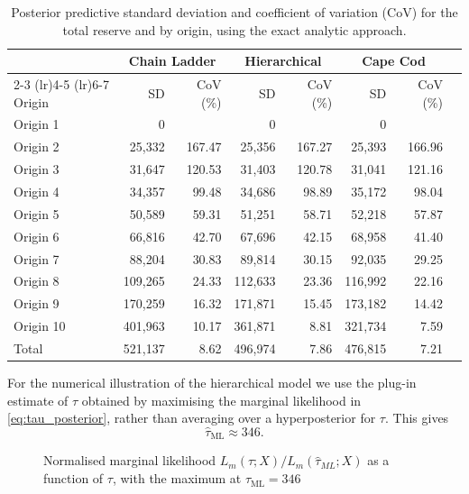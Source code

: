 \documentclass[11pt]{article}
\newcommand{\1}{\mathbf{1}}
\begin{document}
\begin{table}[htbp]
\centering
\begin{tabular}{lrrrrrrr}
\toprule
 & \multicolumn{2}{c}{Chain Ladder} & \multicolumn{2}{c}{Hierarchical} & \multicolumn{2}{c}{Cape Cod} \\
\cmidrule(lr){2-3} \cmidrule(lr){4-5} \cmidrule(lr){6-7}
Origin & SD & CoV (\%) & SD & CoV (\%) & SD & CoV (\%) \\
\midrule
Origin 1 & 0 &  & 0 &  & 0 &  \\
Origin 2 & 25,332 & 167.47 & 25,356 & 167.27 & 25,393 & 166.96 \\
Origin 3 & 31,647 & 120.53 & 31,403 & 120.78 & 31,041 & 121.16 \\
Origin 4 & 34,357 & 99.48 & 34,686 & 98.89 & 35,172 & 98.04 \\
Origin 5 & 50,589 & 59.31 & 51,251 & 58.71 & 52,218 & 57.87 \\
Origin 6 & 66,816 & 42.70 & 67,696 & 42.15 & 68,958 & 41.40 \\
Origin 7 & 88,204 & 30.83 & 89,814 & 30.15 & 92,035 & 29.25 \\
Origin 8 & 109,265 & 24.33 & 112,633 & 23.36 & 116,992 & 22.16 \\
Origin 9 & 170,259 & 16.32 & 171,871 & 15.45 & 173,182 & 14.42 \\
Origin 10 & 401,963 & 10.17 & 361,871 & 8.81 & 321,734 & 7.59 \\
Total & 521,137 & 8.62 & 496,974 & 7.86 & 476,815 & 7.21 \\
\bottomrule
\end{tabular}
\caption{Posterior predictive standard deviation and coefficient of variation (CoV) for the total reserve and by origin, using the exact analytic approach.}
\label{tab:saluz_reserve_sd_analytic}
\end{table}


For the numerical illustration of the hierarchical model  we use the plug-in estimate of $\tau$ obtained by maximising the marginal likelihood in \eqref{eq:tau_posterior}, rather than averaging over a hyperposterior for $\tau$. This gives
\begin{equation}
\widehat{\tau}_{\mathrm{ML}}\approx 346.
\end{equation}


\begin{figure}[htbp]
\centering

\caption{Normalised marginal likelihood $L_m(\tau;X)/L_m(\widehat \tau_{ML};X)$ as a function of $\tau$, with the maximum at $\widehat{\tau}_{\mathrm{ML}}=346$}
\label{fig:tau_likelihood}
\end{figure}
\end{document}
